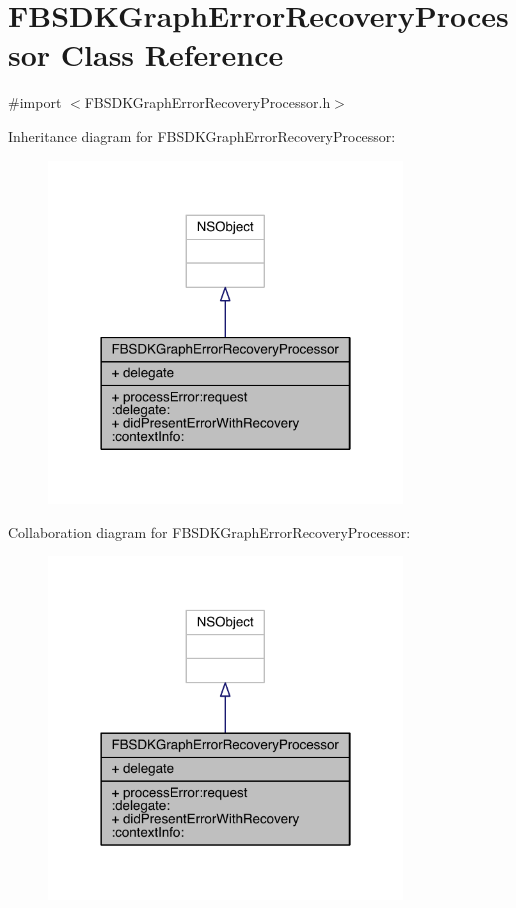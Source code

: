\hypertarget{interface_f_b_s_d_k_graph_error_recovery_processor}{\section{F\-B\-S\-D\-K\-Graph\-Error\-Recovery\-Processor Class Reference}
\label{interface_f_b_s_d_k_graph_error_recovery_processor}
}


{\ttfamily \#import $<$F\-B\-S\-D\-K\-Graph\-Error\-Recovery\-Processor.\-h$>$}



Inheritance diagram for F\-B\-S\-D\-K\-Graph\-Error\-Recovery\-Processor\-:
\nopagebreak
\begin{figure}[H]
\begin{center}
\leavevmode
\includegraphics[width=266pt]{interface_f_b_s_d_k_graph_error_recovery_processor__inherit__graph}
\end{center}
\end{figure}


Collaboration diagram for F\-B\-S\-D\-K\-Graph\-Error\-Recovery\-Processor\-:
\nopagebreak
\begin{figure}[H]
\begin{center}
\leavevmode
\includegraphics[width=266pt]{interface_f_b_s_d_k_graph_error_recovery_processor__coll__graph}
\end{center}
\end{figure}
